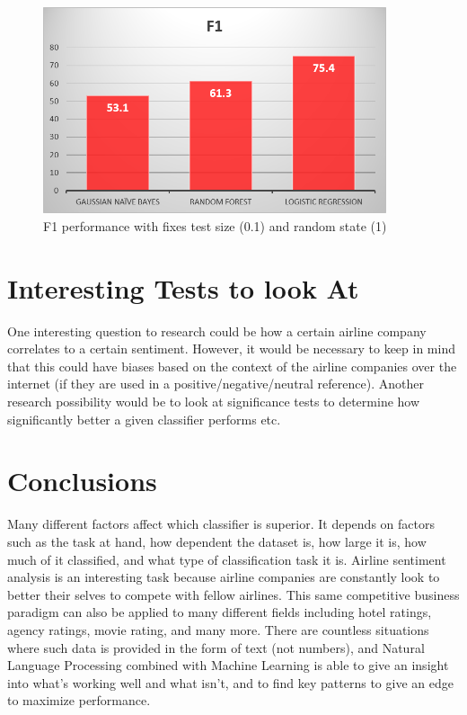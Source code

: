 \documentclass[]{IEEEtran}
\begin{document}
\begin{figure}[ht]
    \begin{minipage}{0.5\textwidth}
        \centering
        \includegraphics[width=0.9\textwidth]{F1.png}
        \caption{F1 performance with fixes test size (0.1) and random state (1) \label{f1}}
    \end{minipage}\hfill
\end{figure}

\section{Interesting Tests to look At}
One interesting question to research could be how a certain airline company correlates to a certain sentiment. However, it would be necessary to keep in mind that this could have biases based on the context of the airline companies over the internet (if they are used in a positive/negative/neutral reference). Another research possibility would be to look at significance tests to determine how significantly better a given classifier performs etc.

\section{Conclusions}
Many different factors affect which classifier is superior. It depends on factors such as the task at hand, how dependent the dataset is, how large it is, how much of it classified, and what type of classification task it is. Airline sentiment analysis is an interesting task because airline companies are constantly look to better their selves to compete with fellow airlines. This same competitive business paradigm can also be applied to many different fields including hotel ratings, agency ratings, movie rating, and many more. There are countless situations where such data is provided in the form of text (not numbers), and Natural Language Processing combined with Machine Learning is able to give an insight into what's working well and what isn't, and to find key patterns to give an edge to maximize performance.



\end{document}
